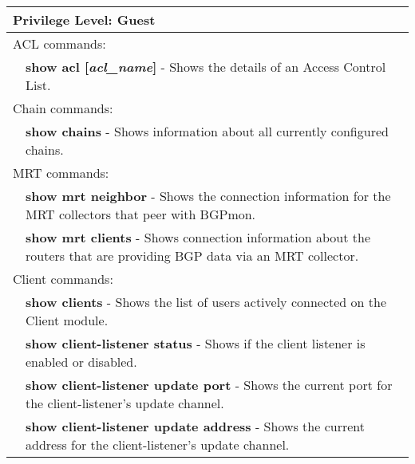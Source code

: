 \newpage
\begin{tabular}{|p{10pt}p{400pt}|}
\hline

\multicolumn{2}{|l|}{{\bf Privilege Level:} Guest }\\ 

\hline

\multicolumn{2}{|l|}{ACL commands:}\\ 

\hline

& {\bf \small show acl [\emph{acl\_name}]} - Shows the details of an Access Control List.\\[4pt]

\hline

\multicolumn{2}{|l|}{Chain commands:}\\ 

\hline

& {\bf \small show chains} - Shows information about all currently configured chains.\\[4pt]

\hline

\multicolumn{2}{|l|}{MRT commands:}\\

& {\bf \small show mrt neighbor} - Shows the connection information for the MRT collectors that peer with BGPmon.\\[4pt]

& {\bf \small show mrt clients} - Shows connection information about the routers that are providing BGP data via an MRT collector.\\[4pt]

\hline

\multicolumn{2}{|l|}{Client commands:}\\ 

\hline

& {\bf \small show clients} - Shows the list of users actively connected on the Client module.\\[4pt]

& {\bf \small show client-listener status} - Shows if the client listener is enabled or disabled.\\[4pt]

& {\bf \small show client-listener update port} - Shows the current port for the client-listener's update channel.\\[4pt]

& {\bf \small show client-listener update address} - Shows the current address for the client-listener's update channel.\\[4pt]


\end{tabular}
